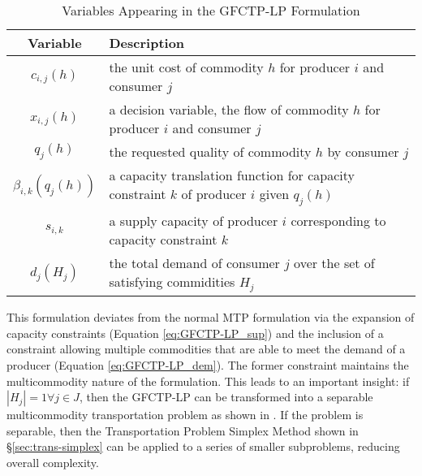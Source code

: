 \begin{table} [h!]
\centering
\begin{tabularx}{\textwidth-20pt}{|c|X|} %
\hline
Variable    & Description \\
\hline
$c_{i,j}(h)$             & the unit cost of commodity $h$ 
                         for producer $i$ and consumer $j$  \\
$x_{i,j}(h)$             & a decision variable, the flow of commodity $h$ 
                         for producer $i$ and consumer $j$  \\
$q_{j}(h)$               & the requested quality of commodity $h$ 
                         by consumer $j$  \\
$\beta_{i,k}(q_{j}(h))$  & a capacity translation function for capacity 
                         constraint $k$ of producer $i$ given $q_{j}(h)$ \\
$s_{i,k}$                & a supply capacity of producer $i$ corresponding to 
                         capacity constraint $k$ \\
$d_{j}(H_{j})$           & the total demand of consumer $j$ over the set of 
                         satisfying commidities $H_{j}$ \\
\hline
\end{tabularx}
\caption{Variables Appearing in the GFCTP-LP Formulation}
\label{tbl:GFCTP-LP-vars}
\end{table}

This formulation deviates from the normal MTP formulation via the expansion of
capacity constraints (Equation \ref{eq:GFCTP-LP_sup}) and the inclusion of a
constraint allowing multiple commodities that are able to meet the demand of a
producer (Equation \ref{eq:GFCTP-LP_dem}). The former constraint maintains the
multicommodity nature of the formulation. This leads to an important insight: if
$\left|{H_{j}}\right| = 1 \forall j \in J$, then the GFCTP-LP can be transformed
into a separable multicommodity transportation problem as shown in
\cite{bertsekas_network_1998}. If the problem is separable, then the
Transportation Problem Simplex Method shown in \S\ref{sec:trans-simplex} can be
applied to a series of smaller subproblems, reducing overall complexity.

